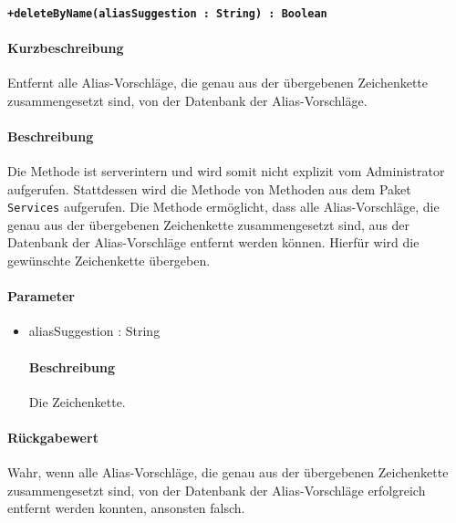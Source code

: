 \paragraph*{\texttt{+deleteByName(aliasSuggestion : String) : Boolean}}%
\paragraph*{Kurzbeschreibung}
Entfernt alle Alias-Vorschläge, die genau aus der übergebenen Zeichenkette zusammengesetzt sind, von der Datenbank der Alias-Vorschläge.
\paragraph*{Beschreibung}
Die Methode ist serverintern und wird somit nicht explizit vom Administrator aufgerufen.
Stattdessen wird die Methode von Methoden aus dem Paket \texttt{Services} aufgerufen.
Die Methode ermöglicht, dass alle Alias-Vorschläge, die genau aus der übergebenen Zeichenkette zusammengesetzt sind, aus der Datenbank der Alias-Vorschläge entfernt werden können.
Hierfür wird die gewünschte Zeichenkette übergeben.
\paragraph*{Parameter}
\begin{itemize}
    \item aliasSuggestion : String
    		\paragraph*{Beschreibung}
    		Die Zeichenkette.
\end{itemize}
\paragraph*{Rückgabewert}
Wahr, wenn alle Alias-Vorschläge, die genau aus der übergebenen Zeichenkette zusammengesetzt sind, von der Datenbank der Alias-Vorschläge erfolgreich entfernt werden konnten, ansonsten falsch.
